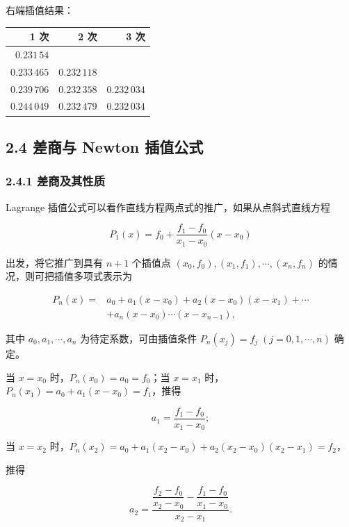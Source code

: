 右端插值结果：

{\def\LTcaptype{none} %
\begin{longtable}[]{@{}rrr@{}}
\toprule\noalign{}
1 次 & 2 次 & 3 次 \\
\midrule\noalign{}
\endhead
\bottomrule\noalign{}
\endlastfoot
\(0.231\,54\) & & \\
\(0.233\,465\) & \(0.232\,118\) & \\
\(0.239\,706\) & \(0.232\,358\) & \(\underline{0.232\,034}\) \\
\(0.244\,049\) & \(0.232\,479\) & \(0.232\,034\) \\
\end{longtable}
}

\subsection{2.4 差商与 Newton 插值公式}\label{ch02a-ux5deeux5546ux4e0e-newton-ux63d2ux503cux516cux5f0f}

\subsubsection{2.4.1 差商及其性质}\label{ch02a-ux5deeux5546ux53caux5176ux6027ux8d28}

Lagrange 插值公式可以看作直线方程两点式的推广，如果从点斜式直线方程

\[
P_1(x)=f_0+\frac{f_1-f_0}{x_1-x_0}(x-x_0)
\]

出发，将它推广到具有 \(n+1\) 个插值点 \((x_0,f_0),(x_1,f_1),\cdots,(x_n,f_n)\) 的情况，则可把插值多项式表示为

\[
\begin{aligned}
P_n(x)={}&a_0+a_1(x-x_0)+a_2(x-x_0)(x-x_1)+\cdots\\
&+a_n(x-x_0)\cdots(x-x_{n-1}),
\end{aligned}
\tag{2.4.1}
\]

其中 \(a_0,a_1,\cdots,a_n\) 为待定系数，可由插值条件 \(P_n(x_j)=f_j\;(j=0,1,\cdots,n)\) 确定。

当 \(x=x_0\) 时，\(P_n(x_0)=a_0=f_0\)；当 \(x=x_1\) 时，\(P_n(x_1)=a_0+a_1(x-x_0)=f_1\)，推得

\[
a_1=\frac{f_1-f_0}{x_1-x_0};
\]

当 \(x=x_2\) 时，\(P_n(x_2)=a_0+a_1(x_2-x_0)+a_2(x_2-x_0)(x_2-x_1)=f_2\)，

推得

\[
a_2=\frac{\dfrac{f_2-f_0}{x_2-x_0}-\dfrac{f_1-f_0}{x_1-x_0}}{x_2-x_1}.
\]

